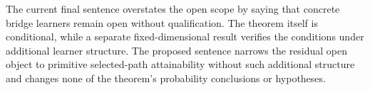 The current final sentence overstates the open scope by saying that concrete bridge learners remain open without qualification.  The theorem itself is conditional, while a separate fixed-dimensional result verifies the conditions under additional learner structure.  The proposed sentence narrows the residual open object to primitive selected-path attainability without such additional structure and changes none of the theorem's probability conclusions or hypotheses.